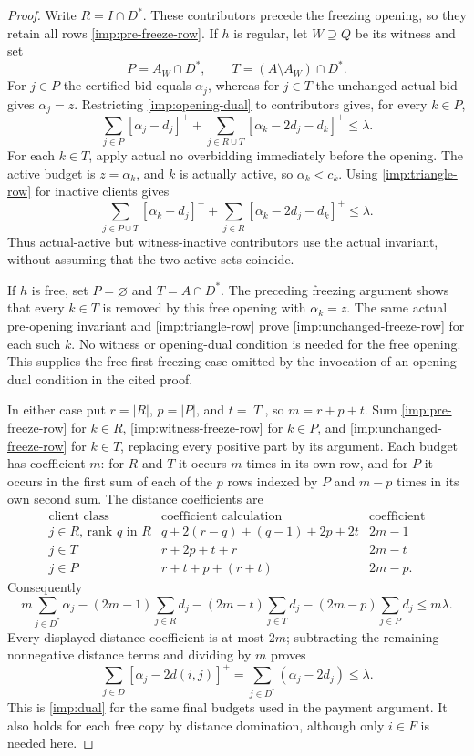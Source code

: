 \begin{proof}
Write $R=I\cap D^*$.  These contributors precede the freezing opening,
so they retain all rows \eqref{imp:pre-freeze-row}.
If $h$ is regular, let $W\supseteq Q$ be its witness and set
\[
 P=A_W\cap D^*,\qquad T=(A\setminus A_W)\cap D^*.
\]
For $j\in P$ the certified bid equals $\alpha_j$, whereas for
$j\in T$ the unchanged actual bid gives $\alpha_j=z$.  Restricting
\eqref{imp:opening-dual} to contributors gives, for every $k\in P$,
\begin{equation}\label{imp:witness-freeze-row}
 \sum_{j\in P}[\alpha_j-d_j]^+
 +\sum_{j\in R\cup T}[\alpha_k-2d_j-d_k]^+\le\lambda.
\end{equation}
For each $k\in T$, apply actual no overbidding immediately before the
opening.  The active budget is $z=\alpha_k$, and $k$ is actually
active, so $\alpha_k<c_k$.  Using \eqref{imp:triangle-row} for
inactive clients gives
\begin{equation}\label{imp:unchanged-freeze-row}
 \sum_{j\in P\cup T}[\alpha_k-d_j]^+
 +\sum_{j\in R}[\alpha_k-2d_j-d_k]^+\le\lambda.
\end{equation}
Thus actual-active but witness-inactive contributors use the actual
invariant, without assuming that the two active sets coincide.

If $h$ is free, set $P=\varnothing$ and $T=A\cap D^*$.
The preceding freezing argument shows that every $k\in T$ is removed
by this free opening with $\alpha_k=z$.  The same actual pre-opening
invariant and \eqref{imp:triangle-row} prove
\eqref{imp:unchanged-freeze-row} for each such $k$.  No witness or
opening-dual condition is needed for the free opening.  This supplies
the free first-freezing case omitted by the invocation of an
opening-dual condition in the cited proof.

In either case put $r=|R|$, $p=|P|$, and $t=|T|$, so $m=r+p+t$.
Sum \eqref{imp:pre-freeze-row} for $k\in R$,
\eqref{imp:witness-freeze-row} for $k\in P$, and
\eqref{imp:unchanged-freeze-row} for $k\in T$, replacing every
positive part by its argument.  Each budget has coefficient $m$:
for $R$ and $T$ it occurs $m$ times in its own row, and for $P$ it
occurs in the first sum of each of the $p$ rows indexed by $P$ and
$m-p$ times in its own second sum.  The distance coefficients are
\[
 \begin{array}{c|c|c}
 \text{client class}&\text{coefficient calculation}&\text{coefficient}\\\hline
 j\in R\text{, rank }q\text{ in }R
    &q+2(r-q)+(q-1)+2p+2t&2m-1\\
 j\in T&r+2p+t+r&2m-t\\
 j\in P&r+t+p+(r+t)&2m-p.
 \end{array}
\]
Consequently
\[
 m\sum_{j\in D^*}\alpha_j
 -(2m-1)\sum_{j\in R}d_j
 -(2m-t)\sum_{j\in T}d_j
 -(2m-p)\sum_{j\in P}d_j\le m\lambda.
\]
Every displayed distance coefficient is at most $2m$; subtracting the
remaining nonnegative distance terms and dividing by $m$ proves
\[
 \sum_{j\in D}[\alpha_j-2d(i,j)]^+
   =\sum_{j\in D^*}(\alpha_j-2d_j)\le\lambda.
\]
This is \eqref{imp:dual} for the same final budgets used in the payment
argument.  It also holds for each free copy by distance domination,
although only $i\in F$ is needed here.


\end{proof}
